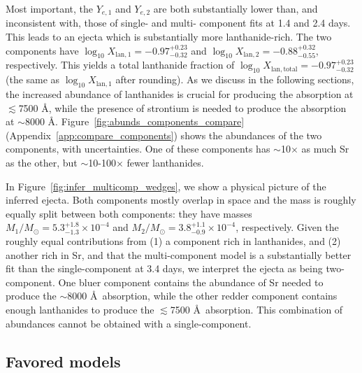 \documentclass[twocolumn,twocolappendix]{aastex63}
\begin{document}
Most important, the $Y_{e,1}$ and $Y_{e,2}$ are both substantially lower than, and inconsistent with, those of single- and multi- component fits at 1.4 and 2.4 days. This leads to an ejecta which is substantially more lanthanide-rich. The two components have $\log_{10} X_{\mathrm{lan},1} = -0.97^{+0.23}_{-0.32}$ and $\log_{10} X_{\mathrm{lan},2} = -0.88^{+0.32}_{-0.55}$, respectively. This yields a total lanthanide fraction of $\log_{10} X_{\mathrm{lan,total}} = -0.97^{+0.23}_{-0.32}$ (the same as $\log_{10} X_{\mathrm{lan},1}$ after rounding). As we discuss in the following sections, the increased abundance of lanthanides is crucial for producing the absorption at $\lesssim$7500 \AA, while the presence of strontium is needed to produce the absorption at $\sim$8000 \AA. Figure~\ref{fig:abunds_components_compare} (Appendix~\ref{app:compare_components}) shows the abundances of the two components, with uncertainties. One of these components has $\sim$10$\times$ as much Sr as the other, but $\sim$10-100$\times$ fewer lanthanides. 

In Figure~\ref{fig:infer_multicomp_wedges}, we show a physical picture of the inferred ejecta. Both components mostly overlap in space and the mass is roughly equally split between both components: they have  masses $M_1/M_{\odot} = 5.3^{+1.8}_{-1.3} \times 10^{-4}$ and $M_2/M_{\odot} = 3.8^{+1.1}_{-0.9} \times 10^{-4}$, respectively.  Given the roughly equal contributions from (1) a component rich in lanthanides, and (2) another rich in Sr, and that the multi-component model is a substantially better fit than the single-component at 3.4 days, we interpret the ejecta as being two-component. One bluer component contains the abundance of Sr needed to produce the $\sim$8000 \AA~absorption, while the other redder component contains enough lanthanides to produce the $\lesssim$7500 \AA~absorption. This combination of abundances cannot be obtained with a single-component.





\subsection{Favored models}
\end{document}
